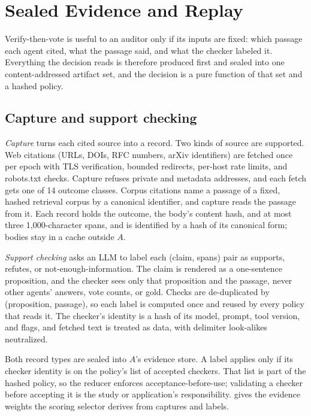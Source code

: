 \section{Sealed Evidence and Replay}
\label{sec:evidence}

Verify-then-vote is useful to an auditor only if its inputs are fixed: which passage each agent cited, what the passage said, and what the checker labeled it. Everything the decision reads is therefore produced first and sealed into one content-addressed artifact set, and the decision is a pure function of that set and a hashed policy.

\subsection{Capture and support checking}
\label{sec:capture}

\emph{Capture} turns each cited source into a record. Two kinds of source are supported. Web citations (URLs, DOIs, RFC numbers, arXiv identifiers) are fetched once per epoch with TLS verification, bounded redirects, per-host rate limits, and robots.txt checks. Capture refuses private and metadata addresses, and each fetch gets one of 14 outcome classes. Corpus citations name a passage of a fixed, hashed retrieval corpus by a canonical identifier, and capture reads the passage from it. Each record holds the outcome, the body's content hash, and at most three 1,000-character spans, and is identified by a hash of its canonical form; bodies stay in a cache outside $A$.

\emph{Support checking} asks an LLM to label each (claim, spans) pair as supports, refutes, or not-enough-information. The claim is rendered as a one-sentence proposition, and the checker sees only that proposition and the passage, never other agents' answers, vote counts, or gold. Checks are de-duplicated by (proposition, passage), so each label is computed once and reused by every policy that reads it. The checker's identity is a hash of its model, prompt, tool version, and flags, and fetched text is treated as data, with delimiter look-alikes neutralized.

Both record types are sealed into $A$'s evidence store. A label applies only if its checker identity is on the policy's list of accepted checkers. That list is part of the hashed policy, so the reducer enforces acceptance-before-use; validating a checker before accepting it is the study or application's responsibility.  gives the evidence weights the scoring selector derives from captures and labels.

